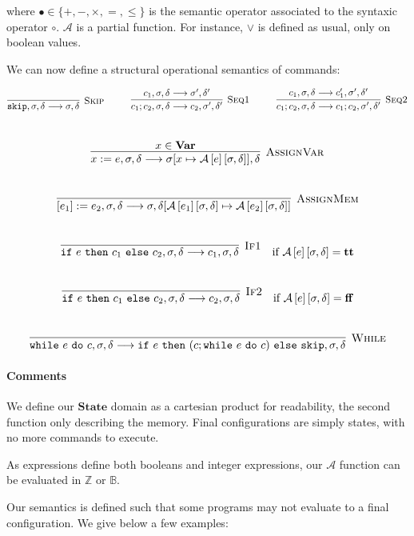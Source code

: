 \documentclass{article}
\newcommand{\var}{\mathbf{Var}}
\newcommand{\state}{\mathbf{State}}
\newcommand{\A}{\mathcal{A}}
\newcommand{\Aa}[2]{\mathcal{A}\left[#1\right]\left[#2\right]}
\newcommand{\true}{\mathbf{tt}}
\newcommand{\false}{\mathbf{ff}}
\newcommand{\Rule}[3]{\infer[\textsc{#1}]{#2}{#3}}
\begin{document}
where $\bullet \in \lbrace +, -, \times, =, \leq \rbrace$ is the semantic operator associated to the syntaxic operator $\circ$. $\A{}$ is a partial function. For instance, $\vee$ is defined as usual, only on boolean values.

We can now define a structural operational semantics of commands:

\[
	\Rule{Skip}{\texttt{skip}, \sigma, \delta \longrightarrow \sigma, \delta}{} \hspace*{1cm}
	\Rule{Seq1}{c_1 ; c_2, \sigma, \delta \longrightarrow c_2, \sigma', \delta'}{c_1, \sigma, \delta \longrightarrow \sigma', \delta'} \hspace*{1cm}
	\Rule{Seq2}{c_1 ; c_2, \sigma, \delta \longrightarrow c_1 ; c_2, \sigma', \delta'}{c_1, \sigma, \delta \longrightarrow c_1', \sigma', \delta'}
\]
\\
\[
	\Rule{AssignVar}{x := e, \sigma, \delta \longrightarrow \sigma[x \mapsto \Aa{e}{\sigma, \delta}], \delta}{x \in \var{}}
\]
\\
\[
	\Rule{AssignMem}{[e_1] := e_2, \sigma, \delta \longrightarrow \sigma, \delta[\Aa{e_1}{\sigma, \delta} \mapsto \Aa{e_2}{\sigma, \delta}]}{}
\]
\\
\[
	\Rule{If1}{\texttt{if}~e~\texttt{then}~c_1~\texttt{else}~c_2, \sigma, \delta \longrightarrow c_1, \sigma, \delta}{} \quad \text{if $\Aa{e}{\sigma, \delta} = \true{}$}
\]
\\
\[
	\Rule{If2}{\texttt{if}~e~\texttt{then}~c_1~\texttt{else}~c_2, \sigma, \delta \longrightarrow c_2, \sigma, \delta}{} \quad \text{if $\Aa{e}{\sigma, \delta} = \false{}$}
\]
\\
\[
	\Rule{While}{\texttt{while}~e~\texttt{do}~c, \sigma, \delta \longrightarrow \texttt{if}~e~\texttt{then}~(c; \texttt{while}~e~\texttt{do}~c)~\texttt{else}~\texttt{skip}, \sigma, \delta}{} 
\]

\paragraph{Comments}
We define our $\state$ domain as a cartesian product for readability, the second function only describing the memory.
Final configurations are simply states, with no more commands to execute.

As expressions define both booleans and integer expressions, our $\A{}$ function can be evaluated in $\mathbb{Z}$ or $\mathbb{B}$.

Our semantics is defined such that some programs may not evaluate to a final configuration. We give below a few examples:
\end{document}
